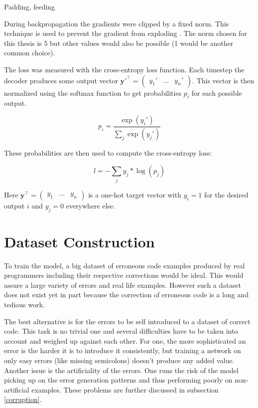 Padding, feeding

 During backpropagation the gradients were clipped by a fixed norm. This technique is used to prevent the gradient from exploding \cite{gradient_clipping}. The norm chosen for this thesis is 5 but other values would also be possible (1 would be another common choice).

 The loss was measured with the cross-entropy loss function. Each timestep the decoder produces some output vector \(\mathbf{y}'^\intercal = \begin{pmatrix} y_1' & ... & y_n'\end{pmatrix}\). This vector is then normalized using the softmax function to get probabilities \(p_i\) for each possible output.

 \begin{equation*}
   p_i = \frac
             {\exp(y_i')}
             {\sum_{j} \exp(y_j')}
 \end{equation*}

 These probabilities are then used to compute the cross-entropy loss:

 \begin{equation*}
   l = - \sum_{j} y_j * \log(p_j)
 \end{equation*}

 Here \(\mathbf{y}^\intercal = \begin{pmatrix} y_1 & ... & y_n \end{pmatrix}\) is a one-hot target vector with \(y_i = 1\) for the desired output \(i\) and \(y_j = 0\) everywhere else.

\section{Dataset Construction}

To train the model, a big dataset of erroneous code examples produced by real programmers including their respective corrections would be ideal. This would assure a large variety of errors and real life examples. However such a dataset does not exist yet in part because the correction of erroneous code is a long and tedious work.

The best alternative is for the errors to be self introduced to a dataset of correct code. This task is no trivial one and several difficulties have to be taken into account and weighed up against each other. For one, the more sophisticated an error is the harder it is to introduce it consistently, but training a network on only easy errors (like missing semicolons) doesn't produce any added value. Another issue is the artificiality of the errors. One runs the risk of the model picking up on the error generation patterns and thus performing poorly on non-artificial examples. These problems are further discussed in subsection \ref{corruption}.

